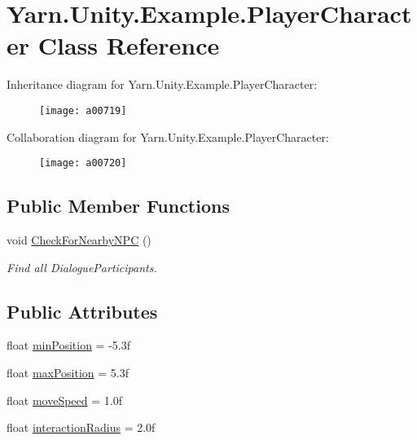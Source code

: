 \hypertarget{a00138}{\section{Yarn.\-Unity.\-Example.\-Player\-Character Class Reference}
\label{a00138}
}


Inheritance diagram for Yarn.\-Unity.\-Example.\-Player\-Character\-:
\nopagebreak
\begin{figure}[H]
\begin{center}
\leavevmode
\texttt{[image: a00719]}
\end{center}
\end{figure}


Collaboration diagram for Yarn.\-Unity.\-Example.\-Player\-Character\-:
\nopagebreak
\begin{figure}[H]
\begin{center}
\leavevmode
\texttt{[image: a00720]}
\end{center}
\end{figure}
\subsection*{Public Member Functions}
\begin{DoxyCompactItemize}
\item 
void \hyperlink{a00138_a574b6d984b8671c7a780d3d10e040a9b}{Check\-For\-Nearby\-N\-P\-C} ()
\begin{DoxyCompactList}\small\item\em Find all Dialogue\-Participants. \end{DoxyCompactList}\end{DoxyCompactItemize}
\subsection*{Public Attributes}
\begin{DoxyCompactItemize}
\item 
float \hyperlink{a00138_ac025d4f4afaf854f8256e0d2d03e5b52}{min\-Position} = -\/5.\-3f
\item 
float \hyperlink{a00138_ada9dd748a1d89a7f9b12ac8967a07ae6}{max\-Position} = 5.\-3f
\item 
float \hyperlink{a00138_adc602a4b2c7e44e4b15a11f1ffcf07e4}{move\-Speed} = 1.\-0f
\item 
float \hyperlink{a00138_af89807d2195915ee9a0c42317e110fc6}{interaction\-Radius} = 2.\-0f
\end{DoxyCompactItemize}
